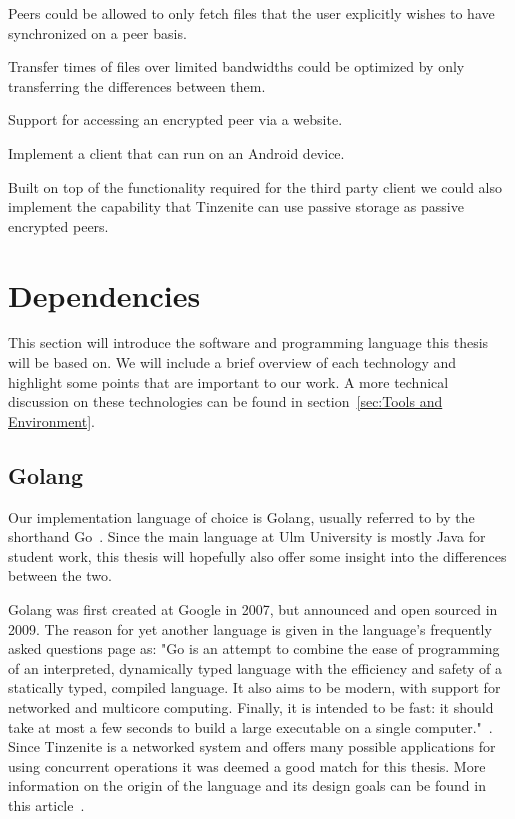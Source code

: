 \begin{description}[leftmargin=7.5em,style=nextline,noitemsep,nolistsep]
\item[Shadow Files]
    Peers could be allowed to only fetch files that the user explicitly wishes to have synchronized on a peer basis.
\item[Delta Updates]
    Transfer times of files over limited bandwidths could be optimized by only transferring the differences between them.
\item[Web Interface]
    Support for accessing an encrypted peer via a website.
\item[Mobile Client]
    Implement a client that can run on an Android device.
\item[Passive Peer]
    Built on top of the functionality required for the third party client we could also implement the capability that Tinzenite can use passive storage as passive encrypted peers.
\end{description}

\section{Dependencies}
\label{sec:Dependencies}

This section will introduce the software and programming language this thesis will be based on.
We will include a brief overview of each technology and highlight some points that are important to our work.
A more technical discussion on these technologies can be found in section~\ref{sec:Tools and Environment}.

\subsection{Golang}
\label{sub:Golang}

Our implementation language of choice is Golang, usually referred to by the shorthand Go~\cite{web:site:golang}.
Since the main language at Ulm University is mostly Java for student work, this thesis will hopefully also offer some insight into the differences between the two.

Golang was first created at Google in 2007, but announced and open sourced in 2009.
The reason for yet another language is given in the language's frequently asked questions page as: "Go is an attempt to combine the ease of programming of an interpreted, dynamically typed language with the efficiency and safety of a statically typed, compiled language. It also aims to be modern, with support for networked and multicore computing. Finally, it is intended to be fast: it should take at most a few seconds to build a large executable on a single computer."~\cite{web:site:golang:faq}.
Since Tinzenite is a networked system and offers many possible applications for using concurrent operations it was deemed a good match for this thesis.
More information on the origin of the language and its design goals can be found in this article~\cite{pike2012go}.

